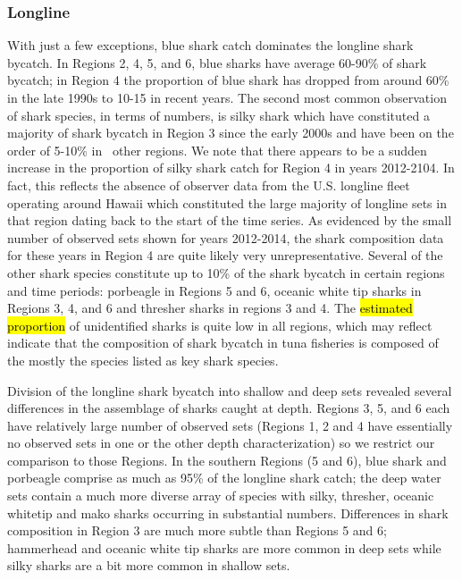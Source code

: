 \documentclass[12pt]{SCreport}
\begin{document}
  \subsubsection*{Longline}  
  

With just a few exceptions, blue shark catch dominates the longline shark bycatch.  In Regions 2, 4, 5, and 6, blue sharks have average 60-90\% of shark bycatch; in Region 4 the proportion of blue shark has dropped from around 60\% in the late 1990s to 10-15 in recent years.  The second most common observation of shark species, in terms of numbers, is silky shark which have constituted a majority of shark bycatch in Region 3 since the early 2000s and have been on the order of 5-10\% in \ other regions.  We note that there appears to be a sudden increase in the proportion of silky shark catch for Region 4 in years 2012-2104.  In fact, this reflects the absence of observer data from the U.S. longline fleet operating around Hawaii which constituted the large majority of longline sets in that region dating back to the start of the time series.  As evidenced by the small number of observed sets shown for years 2012-2014, the shark composition data for these years in Region 4 are quite likely very unrepresentative.  Several of the other shark species constitute up to 10\% of the shark bycatch in certain regions and time periods: porbeagle in Regions 5 and 6, oceanic white tip sharks in Regions 3, 4, and 6 and thresher sharks in regions 3 and 4.  The \hl{estimated proportion} of unidentified sharks is quite low in all regions, which may reflect indicate that the   composition of shark bycatch in tuna fisheries is composed of the mostly the species listed as key shark species.  

Division of the longline shark bycatch into shallow and deep sets revealed several differences in the assemblage of sharks caught at depth.  Regions 3, 5, and 6 each have relatively large number of observed sets (Regions 1, 2 and 4 have essentially no observed sets in one or the other depth characterization) so we restrict our comparison to those Regions.  In the southern Regions (5 and 6), blue shark and porbeagle comprise as much as 95\% of the longline shark catch; the deep water sets contain a much more diverse array of species with silky, thresher, oceanic whitetip and mako sharks occurring in substantial numbers.  Differences in shark composition in Region 3 are much more subtle than Regions 5 and 6; hammerhead and oceanic white tip sharks are more common in deep sets while silky sharks are a bit more common in shallow sets.
\end{document}
